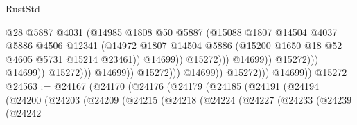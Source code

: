 \begin{lexlean}{RustStd}
\begin{coremodule}
                                                      @28
                                                      @5887
                                                      @4031
                                                      (@14985
                                                        @1808
                                                        @50
                                                        @5887
                                                        (@15088
                                                          @1807
                                                          @14504
                                                          @4037
                                                          @5886
                                                          @4506
                                                          @12341
                                                          (@14972
                                                            @1807
                                                            @14504
                                                            @5886
                                                            (@15200
                                                              @1650
                                                              @18
                                                              @52
                                                              @4605
                                                              @5731
                                                              @15214
                                                              @23461))
                                                          @14699))
                                                      @15272)))
                                                @14699))
                                            @15272)))
                                      @14699))
                                  @15272)))
                            @14699))
                        @15272)))
                  @14699))
              @15272)))
        @14699))
    @15272
@24563 := @24167
    (@24170
      (@24176
        (@24179
          (@24185
            (@24191
              (@24194
                (@24200
                  (@24203
                    (@24209
                      (@24215
                        (@24218
                          (@24224
                            (@24227
                              (@24233
                                (@24239
                                  (@24242

\end{coremodule}
\end{lexlean}
